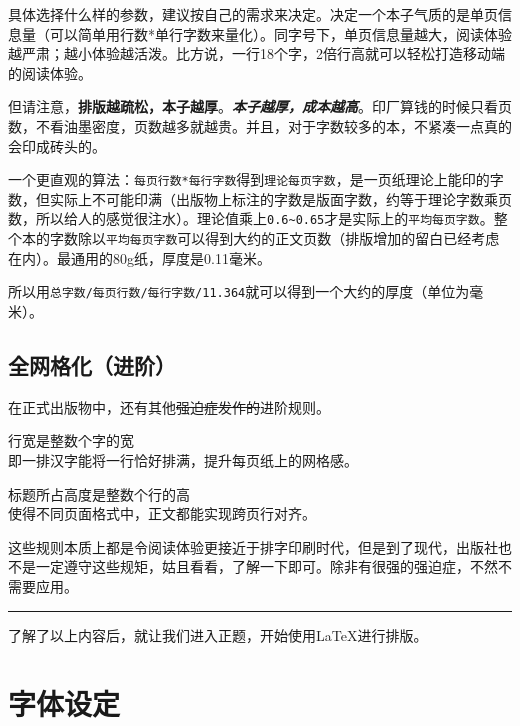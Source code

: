 \documentclass[10pt,openany]{book}
\begin{document}
\blankpar

具体选择什么样的参数，建议按自己的需求来决定。决定一个本子气质的是单页信息量（可以简单用行数*单行字数来量化）。同字号下，单页信息量越大，阅读体验越严肃；越小体验越活泼。比方说，一行18个字，2倍行高就可以轻松打造移动端的阅读体验。

但请注意，\textbf{排版越疏松，本子越厚}。\emph{\textbf{本子越厚，成本越高}}。印厂算钱的时候只看页数，不看油墨密度，页数越多就越贵。并且，对于字数较多的本，不紧凑一点真的会印成砖头的。

一个更直观的算法：\texttt{每页行数*每行字数}得到\texttt{理论每页字数}，是一页纸理论上能印的字数，但实际上不可能印满（出版物上标注的字数是版面字数，约等于理论字数乘页数，所以给人的感觉很注水）。理论值乘上\texttt{0.6\textasciitilde{}0.65}才是实际上的\texttt{平均每页字数}。整个本的字数除以\texttt{平均每页字数}可以得到大约的正文页数（排版增加的留白已经考虑在内）。最通用的80g纸，厚度是0.11毫米。

所以用\texttt{总字数/每页行数/每行字数/11.364}就可以得到一个大约的厚度（单位为毫米）。

\section{全网格化（进阶）}

在正式出版物中，还有其他\sout{强迫症发作的}进阶规则。

\begin{tightenum}
    \item   行宽是整数个字的宽\\即一排汉字能将一行恰好排满，提升每页纸上的网格感。
    \item   标题所占高度是整数个行的高\\使得不同页面格式中，正文都能实现跨页行对齐。
\end{tightenum}

这些规则本质上都是令阅读体验更接近于排字印刷时代，但是到了现代，出版社也不是一定遵守这些规矩，姑且看看，了解一下即可。除非有很强的强迫症，不然不需要应用。

\begin{center}\rule{0.5\linewidth}{0.5pt}\end{center}

了解了以上内容后，就让我们进入正题，开始使用\LaTeX 进行排版。

\chapter{字体设定}
\end{document}
